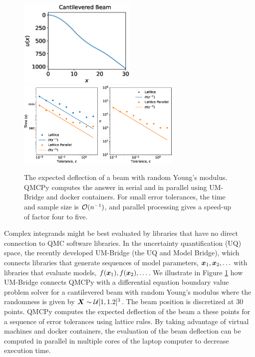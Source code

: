 \documentclass[graybox]{svmult}
\begin{document}
\begin{figure}
    \centering
    \includegraphics[width=0.5\textwidth]{cantileveredbeam.eps}
    \includegraphics[width=0.7\textwidth]{ldparallelbeam.eps}
    \caption{The expected deflection of a beam with random Young's modulus.  QMCPy computes the answer in serial and in parallel using UM-Bridge and docker containers.  For small error tolerances, the time and sample size is ${\mathcal{O}}(n^{-1})$, and parallel processing gives a speed-up of factor four to five.}
    \label{fig:beam}
\end{figure}

Complex integrands might be best evaluated by libraries that have no direct connection to QMC software libraries.  In the uncertainty quantification (UQ) space, the recently developed UM-Bridge \cite{umbridge} (the UQ and Model Bridge), which connects libraries that generate sequences of model parameters, ${\boldsymbol{x}}_1, {\boldsymbol{x}}_2, \ldots$ with libraries that evaluate models, $f({\boldsymbol{x}}_1), f({\boldsymbol{x}}_2), \ldots$.  We illustrate in Figure \ref{fig:beam} how UM-Bridge connects QMCPy with a differential equation boundary value problem solver for a cantilevered beam with random Young's modulus \cite{ParSee22a} where the randomness is given by ${\boldsymbol{X}} \sim {\mathcal{U}}[1,1.2]^3$.  The beam position is discretized at $30$ points.  QMCPy computes the expected deflection of the beam a these points for a sequence of error tolerances using lattice rules.  By taking advantage of virtual machines and docker containers, the evaluation of the beam deflection can be computed in parallel in multiple cores of the laptop computer to decrease execution time.
\end{document}
